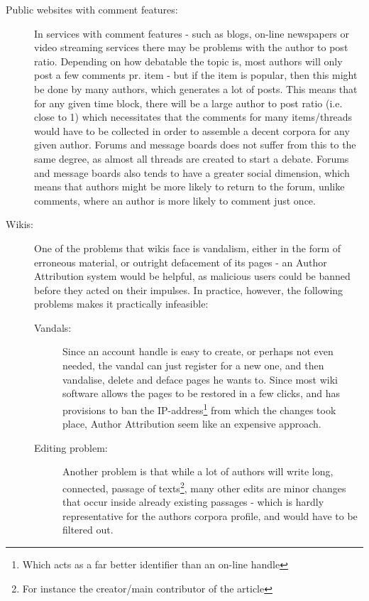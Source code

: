 \begin{description}
\item[Public websites with comment features:] In services with comment features - such as blogs, on-line newspapers or video streaming services there may be problems with the author to post ratio. Depending on how debatable the topic is, most authors will only post a few comments pr. item - but if the item is popular, then this might be done by many authors, which generates a lot of posts. This means that for any given time block, there will be a large author to post ratio (i.e. close to 1) which necessitates that the comments for many items/threads would have to be collected in order to assemble a decent corpora for any given author. Forums and message boards does not suffer from this to the same degree, as almost all threads are created to start a debate. Forums and message boards also tends to have a greater social dimension, which means that authors might be more likely to return to the forum, unlike comments, where an author is more likely to comment just once.

\item[Wikis:] One of the problems that wikis face is vandalism, either in the form of erroneous material, or outright defacement of its pages - an Author Attribution system would be helpful, as malicious users could be banned before they acted on their impulses. In practice, however, the following problems makes it practically infeasible:
\begin{description}
\item[Vandals:] Since an account handle is easy to create, or perhaps not even needed, the vandal can just register for a new one, and then vandalise, delete and deface pages he wants to. Since most wiki software allows the pages to be restored in a few clicks, and has provisions to ban the IP-address\footnote{Which acts as a far better identifier than an on-line handle} from which the changes took place, Author Attribution seem like an expensive approach.  

\item[Editing problem:] Another problem is that while a lot of authors will write long, connected, passage of texts\footnote{For instance the creator/main contributor of the article}, many other edits are minor changes that occur inside already existing passages - which is hardly representative for the authors corpora profile, and would have to be filtered out.   
\end{description} 
\end{description}

